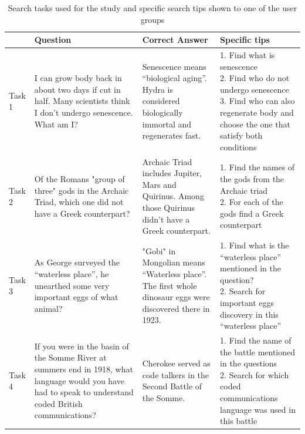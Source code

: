 \documentclass{sig-alternate}
\begin{document}
\begin{table}[tbh]
\centering
\caption{Search tasks used for the study and specific search tips shown to one of the user groups}
\label{table:tasks}
\vspace{-2mm}
\begin{tabular}{|p{1cm}|p{4.5cm}|p{4.2cm}|p{6.0cm}|} \hline
 & Question & Correct Answer & Specific tips \\ \hline
Task 1 & I can grow body back in about two days if cut in half. Many scientists think I don't undergo senescence. What am I? & Senescence means ``biological aging''. Hydra is considered biologically immortal and regenerates fast. & \parbox[t]{6cm}{
1. Find what is senescence\\
2. Find who do not undergo senescence\\
3. Find who can also regenerate body and choose the one that satisfy both conditions} \\ \hline
Task 2 & Of the Romans "group of three" gods in the Archaic Triad, which one did not have a Greek counterpart? & Archaic Triad includes Jupiter, Mars and Quirinus. Among those Quirinus didn't have a Greek counterpart. &
\parbox[t]{6cm}{
1. Find the names of the gods from the Archaic triad\\
2. For each of the gods find a Greek counterpart
}\\ \hline
Task 3 & As George surveyed the ``waterless place'', he unearthed some very important eggs of what animal? & "Gobi" in Mongolian means ``Waterless place''. The first whole dinosaur eggs were discovered there in 1923. & \parbox[t]{6cm}{
1. Find what is the ``waterless place'' mentioned in the question?\\
2. Search for important eggs discovery in this ``waterless place''}\\ \hline
Task 4 & If you were in the basin of the Somme River at summers end in 1918, what language would you have had to speak to understand coded British communications? & Cherokee served as code talkers in the Second Battle of the Somme. & \parbox[t]{6cm}{
1. Find the name of the battle mentioned in the questions\\
2. Search for which coded communications language was used in this battle\\
} \\ \hline
\end{tabular}
\vspace{-2mm}
\end{table}
\end{document}
